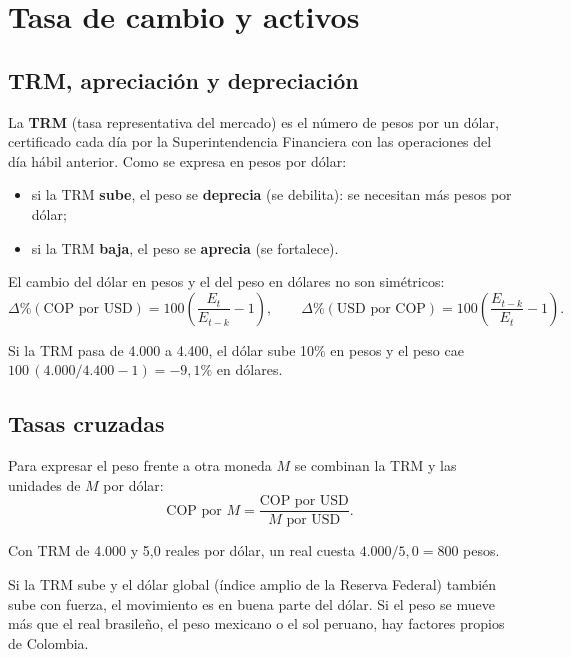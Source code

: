 \chapter{Tasa de cambio y activos}
\label{es:f:cambio}

\section{TRM, apreciación y depreciación}
\label{es:f:trm}
La \textbf{TRM} (tasa representativa del mercado) es el número de pesos por un dólar, certificado cada día por la
Superintendencia Financiera con las operaciones del día hábil anterior. Como se expresa en pesos por dólar:
\begin{itemize}
\item si la TRM \textbf{sube}, el peso se \textbf{deprecia} (se debilita): se necesitan más pesos por dólar;
\item si la TRM \textbf{baja}, el peso se \textbf{aprecia} (se fortalece).
\end{itemize}
El cambio del dólar en pesos y el del peso en dólares no son simétricos:
\[
\Delta\%(\text{COP por USD})=100\left(\frac{E_t}{E_{t-k}}-1\right),\qquad
\Delta\%(\text{USD por COP})=100\left(\frac{E_{t-k}}{E_t}-1\right).
\]

\begin{dato}
Si la TRM pasa de 4.000 a 4.400, el dólar sube 10\% en pesos y el peso cae $100\,(4.000/4.400-1)=-9{,}1\%$ en dólares.
\end{dato}

\section{Tasas cruzadas}
Para expresar el peso frente a otra moneda $M$ se combinan la TRM y las unidades de $M$ por dólar:
\[
\text{COP por }M=\frac{\text{COP por USD}}{M\text{ por USD}} .
\]
\begin{dato}
Con TRM de 4.000 y 5,0 reales por dólar, un real cuesta $4.000/5{,}0=800$ pesos.
\end{dato}

\begin{leer}
Si la TRM sube y el dólar global (índice amplio de la Reserva Federal) también sube con fuerza, el movimiento es en
buena parte del dólar. Si el peso se mueve más que el real brasileño, el peso mexicano o el sol peruano, hay factores
propios de Colombia.
\end{leer}

